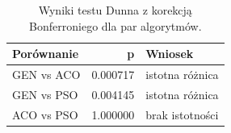 \begin{table}
\caption{Wyniki testu Dunna z korekcją Bonferroniego dla par algorytmów.}
\label{tab:dunn_pairs}
\begin{tabular}{lrl}
\toprule
Porównanie & p & Wniosek \\
\midrule
GEN vs ACO & 0.000717 & istotna różnica \\
GEN vs PSO & 0.004145 & istotna różnica \\
ACO vs PSO & 1.000000 & brak istotności \\
\bottomrule
\end{tabular}
\end{table}
